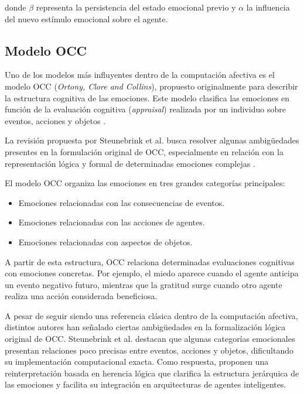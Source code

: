 donde $\beta$ representa la persistencia del estado emocional previo y $\alpha$ la influencia del nuevo estímulo emocional sobre el agente.

\subsection{Modelo OCC}

Uno de los modelos más influyentes dentro de la computación afectiva es el modelo OCC (\textit{Ortony, Clore and Collins}), propuesto originalmente para describir la estructura cognitiva de las emociones. Este modelo clasifica las emociones en función de la evaluación cognitiva (\textit{appraisal}) realizada por un individuo sobre eventos, acciones y objetos \cite{occ2009revisited}.

La revisión propuesta por Steunebrink et al. busca resolver algunas ambigüedades presentes en la formulación original de OCC, especialmente en relación con la representación lógica y formal de determinadas emociones complejas \cite{occ2009revisited}.

El modelo OCC organiza las emociones en tres grandes categorías principales:

\begin{itemize}
    \item Emociones relacionadas con las consecuencias de eventos.
    \item Emociones relacionadas con las acciones de agentes.
    \item Emociones relacionadas con aspectos de objetos.
\end{itemize}

A partir de esta estructura, OCC relaciona determinadas evaluaciones cognitivas con emociones concretas. Por ejemplo, el miedo aparece cuando el agente anticipa un evento negativo futuro, mientras que la gratitud surge cuando otro agente realiza una acción considerada beneficiosa.

A pesar de seguir siendo una referencia clásica dentro de la computación afectiva, distintos autores han señalado ciertas ambigüedades en la formalización lógica original de OCC. Steunebrink et al. \cite{occ2009revisited} destacan que algunas categorías emocionales presentan relaciones poco precisas entre eventos, acciones y objetos, dificultando su implementación computacional exacta. Como respuesta, proponen una reinterpretación basada en herencia lógica que clarifica la estructura jerárquica de las emociones y facilita su integración en arquitecturas de agentes inteligentes.

